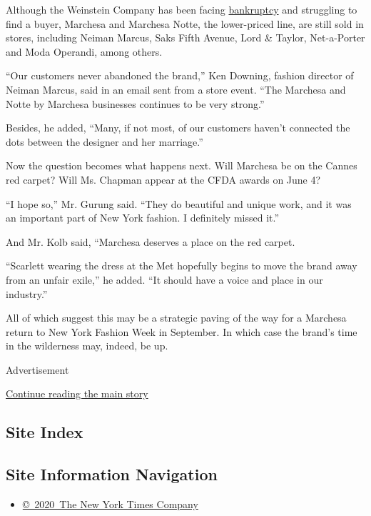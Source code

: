 Although the Weinstein Company has been facing
\href{https://www.nytimes3xbfgragh.onion/2018/05/01/business/media/weinstein-company-lantern-bankruptcy-deal.html}{bankruptcy}
and struggling to find a buyer, Marchesa and Marchesa Notte, the
lower-priced line, are still sold in stores, including Neiman Marcus,
Saks Fifth Avenue, Lord \& Taylor, Net-a-Porter and Moda Operandi, among
others.

``Our customers never abandoned the brand,'' Ken Downing, fashion
director of Neiman Marcus, said in an email sent from a store event.
``The Marchesa and Notte by Marchesa businesses continues to be very
strong.''

Besides, he added, ``Many, if not most, of our customers haven't
connected the dots between the designer and her marriage.''

Now the question becomes what happens next. Will Marchesa be on the
Cannes red carpet? Will Ms. Chapman appear at the CFDA awards on June 4?

``I hope so,'' Mr. Gurung said. ``They do beautiful and unique work, and
it was an important part of New York fashion. I definitely missed it.''

And Mr. Kolb said, ``Marchesa deserves a place on the red carpet.

``Scarlett wearing the dress at the Met hopefully begins to move the
brand away from an unfair exile,'' he added. ``It should have a voice
and place in our industry.''

All of which suggest this may be a strategic paving of the way for a
Marchesa return to New York Fashion Week in September. In which case the
brand's time in the wilderness may, indeed, be up.

Advertisement

\protect\hyperlink{after-bottom}{Continue reading the main story}

\hypertarget{site-index}{%
\subsection{Site Index}\label{site-index}}

\hypertarget{site-information-navigation}{%
\subsection{Site Information
Navigation}\label{site-information-navigation}}

\begin{itemize}
\tightlist
\item
  \href{https://help.nytimes3xbfgragh.onion/hc/en-us/articles/115014792127-Copyright-notice}{©~2020~The
  New York Times Company}
\end{itemize}

